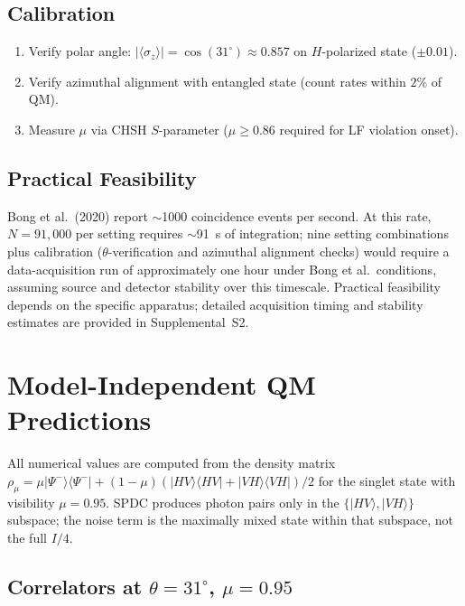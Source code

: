 \documentclass[twocolumn,aps,pra,superscriptaddress,floatfix,10pt]{revtex4-2}
\begin{document}
\subsection{Calibration}
\label{sec:calibration}

\begin{enumerate}
\item Verify polar angle: $|\langle\sigma_z\rangle| = \cos(31^\circ) \approx 0.857$ on $H$-polarized state ($\pm 0.01$).
\item Verify azimuthal alignment with entangled state (count rates within $2\%$ of QM).
\item Measure $\mu$ via CHSH $S$-parameter ($\mu \ge 0.86$ required for LF violation onset).
\end{enumerate}

\subsection{Practical Feasibility}
\label{sec:feasibility}

Bong et al.\ (2020) report $\sim$1000 coincidence events per second. At this rate,
$N = 91{,}000$ per setting requires $\sim$91~s of integration; nine setting
combinations plus calibration ($\theta$-verification and azimuthal alignment checks)
would require a data-acquisition run of approximately one hour under Bong
et al.\ conditions, assuming source and detector stability over this timescale.
Practical feasibility depends on the specific apparatus; detailed acquisition
timing and stability estimates are provided in Supplemental~S2.

\section{Model-Independent QM Predictions}
\label{sec:predictions}

All numerical values are computed from the density matrix
$\rho_\mu = \mu|\Psi^-\rangle\langle\Psi^-| + (1-\mu)(|HV\rangle\langle HV| + |VH\rangle\langle VH|)/2$ for the
singlet state with visibility $\mu = 0.95$. SPDC produces photon pairs only in the
$\{|HV\rangle, |VH\rangle\}$ subspace; the noise term is the maximally mixed state
within that subspace, not the full $I/4$.

\subsection{Correlators at $\theta = 31^\circ$, $\mu = 0.95$}
\label{sec:correlators}
\end{document}
